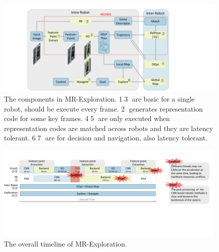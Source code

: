 \begin{figure}[t]
	\centering
	\includegraphics[width=0.99\linewidth]{fig/maexp.pdf}
    \caption{
        The components in MR-Exploration. \textcircled{1}\textcircled{3} are basic for a single robot, should be execute every frame. \textcircled{2} generates representation code for some key frames. \textcircled{4}\textcircled{5} are only executed when representation codes are matched across robots and they are latency tolerant.  \textcircled{6}\textcircled{7} are for decision and navigation, also latency tolerant.
    }
	\label{fig:maexp}
\end{figure}






\begin{figure}[t]
    \centering
	\includegraphics[width=0.99\textwidth]{fig/overalltime.pdf} 	
    \caption{
    The overall timeline of MR-Exploration.
    }
	\label{fig:overalltime}
\end{figure}

